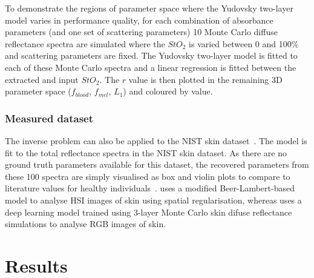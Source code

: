 
To demonstrate the regions of parameter space where the Yudovsky two-layer model varies in performance quality, for each combination of absorbance parameters (and one set of scattering parameters) 10 Monte Carlo diffuse reflectance spectra are simulated where the $StO_2$ is varied between 0 and 100\% and scattering parameters are fixed. The Yudovsky two-layer model is fitted to each of these Monte Carlo spectra and a linear regression is fitted between the extracted and input $StO_2$. The $r$ value is then plotted in the remaining 3D parameter space ($f_{blood}$, $f_{mel}$, $L_1$) and coloured by value.

\subsubsection{Measured dataset}
The inverse problem can also be applied to the NIST skin dataset~\cite{Cooksey2017}. The model is fit to the total reflectance spectra in the NIST skin dataset. As there are no ground truth parameters available for this dataset, the recovered parameters from these 100 spectra are simply visualised as box and violin plots to compare to literature values for healthy individuals~\cite{Jacques2013, VanManen2021, Nishidate2011, Lintzeri2022}.  uses a modified Beer-Lambert-based model to analyse HSI images of skin using spatial regularisation, whereas  uses a deep learning model trained using 3-layer Monte Carlo skin difuse reflectance simulations to analyse RGB images of skin. 

\section{Results}\label{sec:results2}

